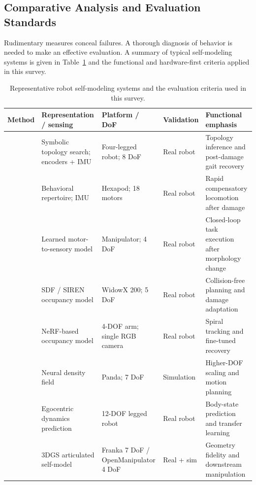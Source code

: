\documentclass[11pt,a4paper]{article}
\begin{document}
\subsection{Comparative Analysis and Evaluation Standards}

Rudimentary measures conceal failures. A thorough diagnosis of behavior is needed to make an effective evaluation. A summary of typical self-modeling systems is given in Table~\ref{tab:selfmodel_comparison} and the functional and hardware-first criteria applied in this survey.

\begin{table}[t]
\centering
\caption{Representative robot self-modeling systems and the evaluation criteria used in this survey.}
\label{tab:selfmodel_comparison}
\renewcommand{\arraystretch}{1.15}
\footnotesize
\begin{tabularx}{\textwidth}{@{}p{2.5cm}p{3.0cm}p{2.2cm}p{2.1cm}X@{}}
\toprule
Method & Representation / sensing & Platform / DoF & Validation & Functional emphasis \\
\midrule
\cite{bongard2006resilient} & Symbolic topology search; encoders + IMU & Four-legged robot; 8 DoF & Real robot & Topology inference and post-damage gait recovery \\
\cite{cully2015robots} & Behavioral repertoire; IMU & Hexapod; 18 motors & Real robot & Rapid compensatory locomotion after damage \\
\cite{kwiatkowski2019task} & Learned motor-to-sensory model & Manipulator; 4 DoF & Real robot & Closed-loop task execution after morphology change \\
\cite{chen2022full} & SDF / SIREN occupancy model & WidowX 200; 5 DoF & Real robot & Collision-free planning and damage adaptation \\
\cite{hu2024teaching} & NeRF-based occupancy model & 4-DOF arm; single RGB camera & Real robot & Spiral tracking and fine-tuned recovery \\
\cite{schulze2024high} & Neural density field & Panda; 7 DoF & Simulation & Higher-DOF scaling and motion planning \\
\cite{hu2024egocentric} & Egocentric dynamics prediction & 12-DOF legged robot & Real robot & Body-state prediction and transfer learning \\
\cite{hu2025learning} & 3DGS articulated self-model & Franka 7 DoF / OpenManipulator 4 DoF & Real + sim & Geometry fidelity and downstream manipulation \\
\bottomrule
\end{tabularx}
\end{table}
\end{document}
